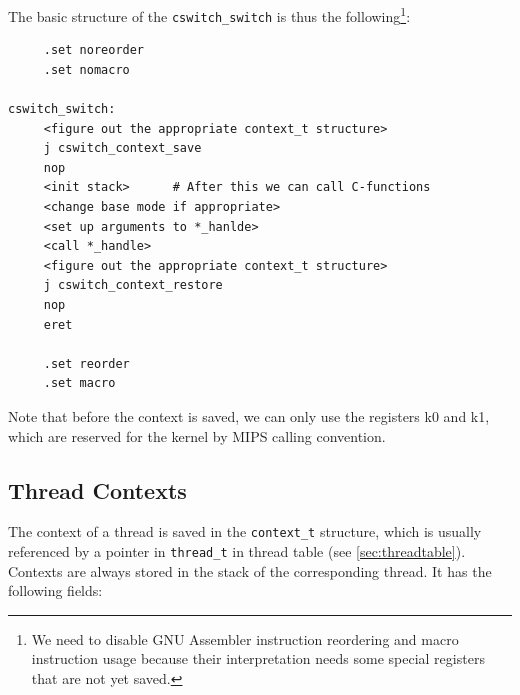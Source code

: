 \documentclass[twoside,a4paper]{report}
\begin{document}

The basic structure of the \texttt{cswitch\_switch} is thus the
following\footnote{We need to disable GNU Assembler instruction
reordering and macro instruction usage because their interpretation
needs some special registers that are not yet saved.}:

\begin{verbatim}
     .set noreorder
     .set nomacro

cswitch_switch:
     <figure out the appropriate context_t structure>
     j cswitch_context_save
     nop
     <init stack>      # After this we can call C-functions
     <change base mode if appropriate>
     <set up arguments to *_hanlde>
     <call *_handle>
     <figure out the appropriate context_t structure>
     j cswitch_context_restore
     nop
     eret

     .set reorder
     .set macro
\end{verbatim}

Note that before the context is saved, we can only use the registers
k0 and k1, which are reserved for the kernel by MIPS calling
convention.

\subsection{Thread Contexts}
\label{sec:threadcontext}

The context of a thread is saved in the \texttt{context\_t} structure,
which is usually referenced by a pointer in \texttt{thread\_t} in
thread table (see \autoref{sec:threadtable}). Contexts are always
stored in the stack of the corresponding thread. It has the following
fields:
\end{document}
